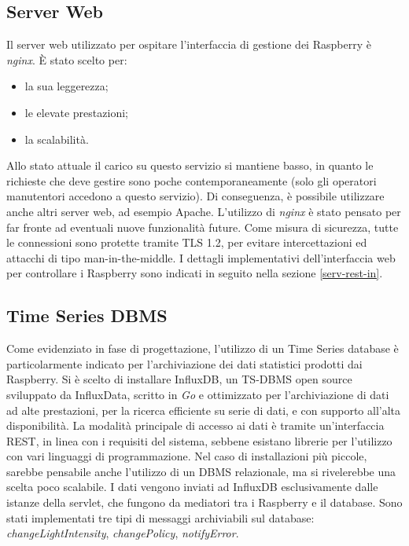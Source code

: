 \subsection{Server Web}
Il server web utilizzato per ospitare l'interfaccia di gestione dei Raspberry è \textit{nginx}. È stato scelto per:
\begin{itemize}
 \item la sua leggerezza;
 \item le elevate prestazioni;
 \item la scalabilità.
\end{itemize}
Allo stato attuale il carico su questo servizio si mantiene basso, in quanto le richieste che deve gestire sono poche contemporaneamente (solo gli operatori manutentori accedono a questo servizio).
Di conseguenza, è possibile utilizzare anche altri server web, ad esempio Apache. L'utilizzo di \textit{nginx} è stato pensato per far fronte ad eventuali nuove funzionalità future.
Come misura di sicurezza, tutte le connessioni sono protette tramite TLS 1.2, per evitare intercettazioni ed attacchi di tipo man-in-the-middle.
I dettagli implementativi dell'interfaccia web per controllare i Raspberry sono indicati in seguito nella sezione \ref{serv-rest-in}.

\subsection{Time Series DBMS \label{tsdbms}}
Come evidenziato in fase di progettazione, l'utilizzo di un Time Series database è particolarmente indicato per l'archiviazione dei dati statistici prodotti dai Raspberry.
Si è scelto di installare InfluxDB, un TS-DBMS open source sviluppato da InfluxData, scritto in \textit{Go} e ottimizzato per l'archiviazione di dati ad alte prestazioni, per la ricerca efficiente su serie di dati, e con supporto all'alta disponibilità.
La modalità principale di accesso ai dati è tramite un'interfaccia REST, in linea con i requisiti del sistema, sebbene esistano librerie per l'utilizzo con vari linguaggi di programmazione.
Nel caso di installazioni più piccole, sarebbe pensabile anche l'utilizzo di un DBMS relazionale, ma si rivelerebbe una scelta poco scalabile.
I dati vengono inviati ad InfluxDB esclusivamente dalle istanze della servlet, che fungono da mediatori tra i Raspberry e il database.
Sono stati implementati tre tipi di messaggi archiviabili sul database: \textit{changeLightIntensity}, \textit{changePolicy}, \textit{notifyError}.
